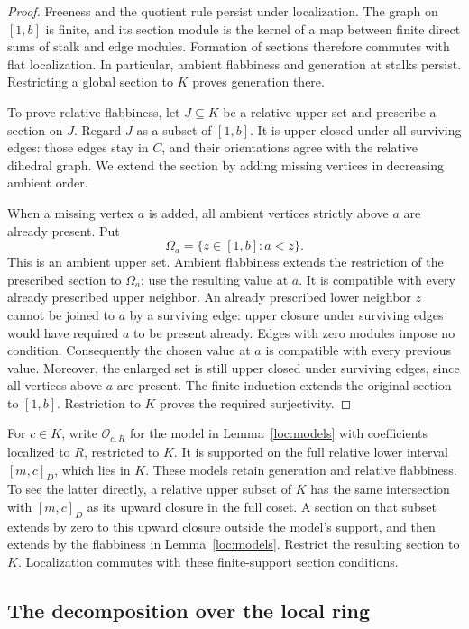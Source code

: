 \begin{proof}
Freeness and the quotient rule persist under localization.  The graph
on $[1,b]$ is finite, and its section module is the kernel of a map
between finite direct sums of stalk and edge modules.  Formation of
sections therefore commutes with flat localization.  In particular,
ambient flabbiness and generation at stalks persist.  Restricting a
global section to $K$ proves generation there.

To prove relative flabbiness, let $J\subseteq K$ be a relative upper
set and prescribe a section on $J$.  Regard $J$ as a subset of $[1,b]$.
It is upper closed under all surviving edges: those edges stay in $C$,
and their orientations agree with the relative dihedral graph.
We extend the section by adding missing vertices in decreasing ambient
order.

When a missing vertex $a$ is added, all ambient vertices strictly above
$a$ are already present.  Put
\[
 \Omega_a=\{z\in[1,b]:a<z\}.
\]
This is an ambient upper set.  Ambient flabbiness extends the restriction
of the prescribed section to $\Omega_a$; use the resulting value at $a$.
It is compatible with every already prescribed upper neighbor.
An already prescribed lower neighbor $z$ cannot be joined to $a$ by a
surviving edge: upper closure under surviving edges would have required
$a$ to be present already.  Edges with zero modules impose no condition.
Consequently the chosen value at $a$ is compatible with every previous
value.  Moreover, the enlarged set is still upper closed under surviving
edges, since all vertices above $a$ are present.
The finite induction extends the original section to $[1,b]$.
Restriction to $K$ proves the required surjectivity.
\end{proof}

For $c\in K$, write $\mathcal O_{c,R}$ for the model in
Lemma~\ref{loc:models} with coefficients localized to $R$, restricted to
$K$.  It is supported on the full relative lower interval $[m,c]_D$,
which lies in $K$.  These models retain generation and relative
flabbiness.  To see the latter directly, a relative upper subset of
$K$ has the same intersection with $[m,c]_D$ as its upward closure in
the full coset.  A section on that subset extends by zero to this upward
closure outside the model's support, and then extends by the flabbiness
in Lemma~\ref{loc:models}.  Restrict the resulting section to $K$.
Localization commutes with these finite-support section conditions.

\subsection{The decomposition over the local ring}

